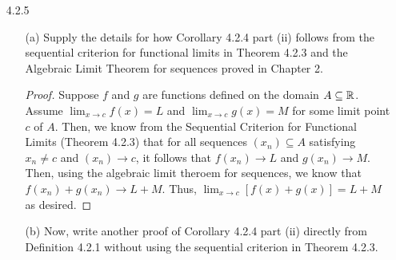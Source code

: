 \documentclass[12pt,letterpaper]{article}
\begin{document}
\begin{itemize}[leftmargin=!,labelindent=5pt]
\begin{itemize}
                    My conjecture is that $\lim_{x \to 1} t(x) = 0$.
                    \begin{proof}
                        Suppose $\epsilon > 0$.
                        Consider the set $T = \{x\in \bbR : t(x) \geq \epsilon\}$.
                        From the way $T$ is defined, we know that $x \in T$ means that either $x=0$ or $x=\frac{m}{n}$ in simplest form where $m,n \in \bbQ - \{0\}$ with $n>0$.
                        Since $x$ approaches 1 in our limit, $x \in T$ is of the latter form. 
                        So, $x = \frac{m}{n}$ which means $t(x) = \frac{1}{n} \geq \epsilon$ which simplifies to $n \leq \frac{1}{\epsilon}$.
                        Given some arbitrary finite interval $(0,a]$ where $a \in \bbR$, the set $T \cap (0,a]$ is also finite since there are only a finite amount of rational numbers $\frac{m}{n}$ with $n \leq \frac{1}{\epsilon}$.
                        Since this set is finite choose $\delta = \min{\{y : y \in T \cap (0,a]\}}$.
                        We can see that this choice of $\delta$ is correct because choosing $x \in V_\delta(1)$ means $x \notin T$ which means $t(x) \in V_\epsilon(0)$.
                    \end{proof}
            \end{itemize}
        \item [4.2.5] 
            \begin{itemize}
                \item [(a)] Supply the details for how Corollary 4.2.4 part (ii) follows from the sequential criterion for functional limits in Theorem 4.2.3 and the Algebraic Limit Theorem for sequences proved in Chapter 2.
                    \begin{proof}
                        Suppose $f$ and $g$ are functions defined on the domain $A \subseteq \mathbb{R}$.
                        Assume $\lim_{x \to c} f(x) = L$ and $\lim_{x \to c} g(x) = M$ for some limit point $c$ of $A$.
                        Then, we know from the Sequential Criterion for Functional Limits (Theorem 4.2.3) that for all sequences $(x_n) \subseteq A$ satisfying $x_n \neq c$ and $(x_n) \to c$, it follows that $f(x_n) \to L$ and $g(x_n) \to M$.
                        Then, using the algebraic limit theroem for sequences, we know that $f(x_n) + g(x_n) \to L+M$.
                        Thus, $\lim_{x \to c} [f(x) + g(x)] = L + M$ as desired.
                    \end{proof}
                \item [(b)] Now, write another proof of Corollary 4.2.4 part (ii) directly from Definition 4.2.1 without using the sequential criterion in Theorem 4.2.3.

\end{itemize}
\end{itemize}
\end{document}
